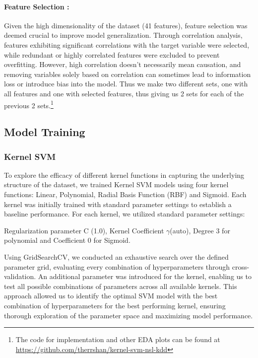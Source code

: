 \documentclass{article}
\begin{document}
\paragraph{Feature Selection :}

Given the high dimensionality of the dataset (41 features), feature selection was deemed crucial to improve model generalization. Through correlation analysis, features exhibiting significant correlations with the target variable were selected, while redundant or highly correlated features were excluded to prevent overfitting. However, high correlation doesn't necessarily mean causation, and removing variables solely based on correlation can sometimes lead to information loss or introduce bias into the model. Thus we make two different sets, one with all features and one with selected features, thus giving us 2 sets for each of the previous 2 sets.\footnote{The code for implementation and other EDA plots can be found at \url{https://github.com/therrshan/kernel-svm-nsl-kdd}}

\subsection{Model Training}

\subsubsection{Kernel SVM}

To explore the efficacy of different kernel functions in capturing the underlying structure of the dataset, we trained Kernel SVM models using four kernel functions: Linear, Polynomial, Radial Basis Function (RBF) and Sigmoid. Each kernel was initially trained with standard parameter settings to establish a baseline performance. For each kernel, we utilized standard parameter settings:

Regularization parameter C (1.0), Kernel Coefficient \(\gamma\)(auto), Degree 3 for polynomial and Coefficient 0 for Sigmoid.

Using GridSearchCV, we conducted an exhaustive search over the defined parameter grid, evaluating every combination of hyperparameters through cross-validation. An additional parameter was introduced for the kernel, enabling us to test all possible combinations of parameters across all available kernels. This approach allowed us to identify the optimal SVM model with the best combination of hyperparameters for the best performing kernel, ensuring thorough exploration of the parameter space and maximizing model performance.
\end{document}
